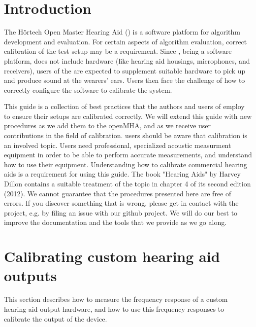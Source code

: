 \documentclass[11pt,a4paper,twoside]{article}
\newcommand{\+}{\discretionary{\mbox{\scriptsize$\hookleftarrow$}}{}{}}
\begin{document}
\newpage
\MHAcopyright{}
\newpage
\tableofcontents
\newpage
\renewcommand{\leftmark}{\rightmark}

\section{Introduction}

The H\"{o}rtech Open Master Hearing Aid (\mha{}) is a software platform
for algorithm development and evaluation.
%
For certain aspects of algorithm evaluation, correct calibration of the
test setup may be a requirement.
%
Since \mha{}, being a software platform, does not include hardware
(like hearing aid housings, microphones, and receivers),
users of the \mha{} are expected to supplement suitable hardware
to pick up and produce sound at the wearers' ears.
%
Users then face the challenge of how to correctly configure the software
to calibrate the system.

This guide is a collection of best practices that the authors and users
of \mha{} employ to ensure their setups are calibrated correctly.
%
We will extend this guide with new procedures as we add them to the
openMHA, and as we receive user contributions in the field of
calibration.
%
\mha{} users should be aware that calibration is an involved topic.
%
Users need professional, specialized acoustic measurment equipment in
order to be able to perform accurate measurements, and understand
how to use their equipment.
%
Understanding how to calibrate commercial hearing aids is a requirement
for using this guide.
%
The book "Hearing Aids" by Harvey Dillon contains a suitable treatment
of the topic in chapter 4 of its second edition (2012).
%
We cannot guarantee that the procedures presented here are free of
errors.
%
If you discover something that is wrong, please get in contact with
the \mha{} project, e.g. by filing an issue with our github project.
%
We will do our best to improve the documentation and the tools that we
provide as we go along.

\section{Calibrating custom hearing aid outputs}

This section describes how to measure the frequency response of a
custom hearing aid output hardware, and how to use this frequency
responses to calibrate the output of the device.
\end{document}

